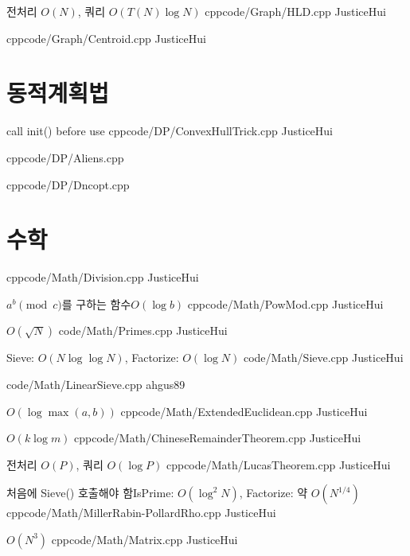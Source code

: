 \documentclass[landscape, 8pt, a4paper, twocolumn]{extarticle} %
\begin{document}
{}{전처리 $O(N)$, 쿼리 $O(T(N) \log N)$}
{cpp}{code/Graph/HLD.cpp}
{JusticeHui}

{}{}
{cpp}{code/Graph/Centroid.cpp}
{JusticeHui}

\section{동적계획법}

{call init() before use}{}
{cpp}{code/DP/ConvexHullTrick.cpp}
{JusticeHui}

{}{}
{cpp}{code/DP/Aliens.cpp}
{}

{}{}
{cpp}{code/DP/Dncopt.cpp}
{}

\section{수학}

{}{}
{cpp}{code/Math/Division.cpp}
{JusticeHui}

{$a^b \pmod c$를 구하는 함수}{$O(\log b)$}
{cpp}{code/Math/PowMod.cpp}
{JusticeHui}

{}{$O(\sqrt N)$}
{}{code/Math/Primes.cpp}
{JusticeHui}

{}{Sieve: $O(N \log \log N)$, Factorize: $O(\log N)$}
{}{code/Math/Sieve.cpp}
{JusticeHui}

{}{}
{}{code/Math/LinearSieve.cpp}
{ahgus89}

{}{$O(\log \max(a,b))$}
{cpp}{code/Math/ExtendedEuclidean.cpp}
{JusticeHui}

{}{$O(k \log m)$}
{cpp}{code/Math/ChineseRemainderTheorem.cpp}
{JusticeHui}

{}{전처리 $O(P)$, 쿼리 $O(\log P)$}
{cpp}{code/Math/LucasTheorem.cpp}
{JusticeHui}

{처음에 Sieve() 호출해야 함}{IsPrime: $O(\log^2 N)$, Factorize: 약 $O(N^{1/4})$}
{cpp}{code/Math/MillerRabin-PollardRho.cpp}
{JusticeHui}

{}{$O(N^3)$}
{cpp}{code/Math/Matrix.cpp}
{JusticeHui}
\end{document}
